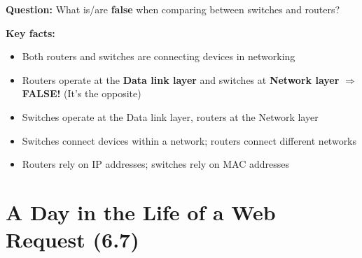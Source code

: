 \begin{imagebox}
\end{imagebox}

\begin{exambox}
\textbf{Question:} What is/are \textbf{false} when comparing between switches and routers?

\textbf{Key facts:}
\begin{itemize}[noitemsep]
    \item Both routers and switches are connecting devices in networking \checkmark
    \item Routers operate at the \textbf{Data link layer} and switches at \textbf{Network layer} $\Rightarrow$ \textbf{FALSE!} (It's the opposite)
    \item Switches operate at the Data link layer, routers at the Network layer \checkmark
    \item Switches connect devices within a network; routers connect different networks \checkmark
    \item Routers rely on IP addresses; switches rely on MAC addresses \checkmark
\end{itemize}
\end{exambox}

\begin{imagebox}[VLANs]
\end{imagebox}

\section{A Day in the Life of a Web Request (6.7)}

